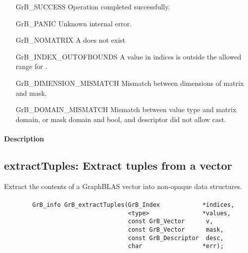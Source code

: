\begin{itemize}[leftmargin=2.1in]
    \item[{\sf GrB\_SUCCESS}]     Operation completed successfully.
    \item[{\sf GrB\_PANIC}]            Unknown internal error.
    \item[{\sf GrB\_NOMATRIX}]      {\sf A} does not exist
    \item[{\sf GrB\_INDEX\_OUTOFBOUNDS}]
                       A value in {\sf indices} is outside the allowed range for .
    \item[\sf GrB\_DIMENSION\_MISMATCH]  
                       Mismatch between dimensions of matrix and mask. 
    \item[\sf GrB\_DOMAIN\_MISMATCH]  
                       Mismatch between value type and matrix domain, or mask domain and {\sf bool}, and descriptor did not allow cast.
\end{itemize}

\paragraph{Description}



\subsection{{\sf extractTuples}: Extract tuples from a vector}
\label{Sec:extractTuples}

Extract the contents of a GraphBLAS vector into non-opaque data structures.

\paragraph{\syntax}

\begin{verbatim}
        GrB_info GrB_extractTuples(GrB_Index            *indices,
                                   <type>               *values, 
                                   const GrB_Vector      v,
                                   const GrB_Vector      mask,
                                   const GrB_Descriptor  desc,
                                   char                 *err);

\end{verbatim}

